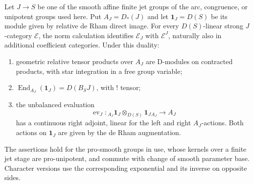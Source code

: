 \begin{proposition}
\label{loop:relative-equivariance}
Let $J\to S$ be one of the smooth affine finite jet groups of the arc,
congruence, or unipotent groups used here.  Put
$A_J=D_*(J)$ and let $\mathbf1_J=D(S)$ be its module given by relative
de Rham direct image.  For every $D(S)$-linear strong $J$-category
$\mathcal E$, the norm calculation identifies
$\mathcal E_J$ with $\mathcal E^J$, naturally also in additional
coefficient categories.  Under this duality:
\begin{enumerate}
\item geometric relative tensor products over $A_J$ are D-modules on
contracted products, with star integration in a free group variable;
\item $\operatorname{End}_{A_J}(\mathbf1_J)=D(B_SJ)$, with ! tensor;
\item the unbalanced evaluation
\[
 \operatorname{ev}_J:
 {}_{A_J}\mathbf1_J\otimes_{D(S)}\mathbf1_J{}_{A_J}
       \longrightarrow A_J
\]
has a continuous right adjoint, linear for the left and right
$A_J$-actions.  Both actions on $\mathbf1_J$ are given by the
de Rham augmentation.
\end{enumerate}
The assertions hold for the pro-smooth groups in use, whose kernels
over a finite jet stage are pro-unipotent, and commute with change of
smooth parameter base.  Character versions use the corresponding
exponential and its inverse on opposite sides.
\end{proposition}


